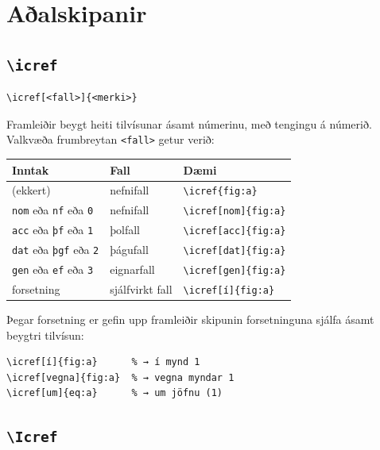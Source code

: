 \documentclass{article}
\begin{document}
\section{Aðalskipanir}

\subsection{\texttt{\textbackslash icref}}

\begin{lstlisting}
\icref[<fall>]{<merki>}
\end{lstlisting}

Framleiðir beygt heiti tilvísunar ásamt númerinu, með tengingu á
númerið. Valkvæða frumbreytan \texttt{<fall>} getur verið:

\begin{center}
\begin{tabular}{lll}
  \toprule
  Inntak & Fall & Dæmi \\
  \midrule
  (ekkert) & nefnifall & \verb|\icref{fig:a}| \\
  \texttt{nom} eða \texttt{nf} eða \texttt{0} & nefnifall & \verb|\icref[nom]{fig:a}| \\
  \texttt{acc} eða \texttt{þf} eða \texttt{1} & þolfall & \verb|\icref[acc]{fig:a}| \\
  \texttt{dat} eða \texttt{þgf} eða \texttt{2} & þágufall & \verb|\icref[dat]{fig:a}| \\
  \texttt{gen} eða \texttt{ef} eða \texttt{3} & eignarfall & \verb|\icref[gen]{fig:a}| \\
  forsetning & sjálfvirkt fall & \verb|\icref[í]{fig:a}| \\
  \bottomrule
\end{tabular}
\end{center}

Þegar forsetning er gefin upp framleiðir skipunin forsetninguna sjálfa
ásamt beygtri tilvísun:

\begin{lstlisting}
\icref[í]{fig:a}      % → í mynd 1
\icref[vegna]{fig:a}  % → vegna myndar 1
\icref[um]{eq:a}      % → um jöfnu (1)
\end{lstlisting}

\subsection{\texttt{\textbackslash Icref}}
\end{document}
